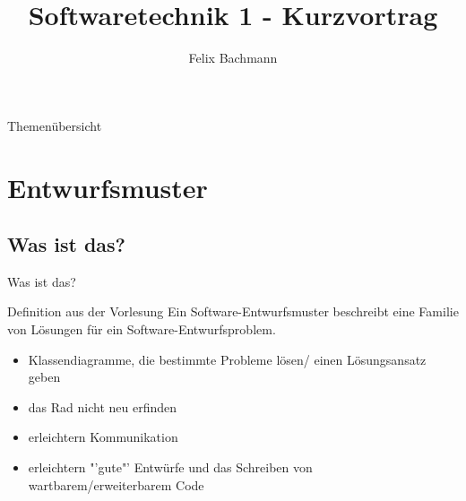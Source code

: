 \documentclass[18pt]{beamer}
\title[SWT1: Kurzvortrag]{Softwaretechnik 1 - Kurzvortrag}
\author{Felix Bachmann}
\institute{KIT - Institut für Programmstrukturen und Datenorganisation (IPD)}
\begin{document}

\begin{frame}
\titlepage
\end{frame}

\begin{frame}{Themenübersicht}
\tableofcontents
\end{frame}

\section{Entwurfsmuster}
	\subsection{Was ist das?}
		\begin{frame}{Was ist das?}	
			\begin{block}{Definition aus der Vorlesung}
				Ein Software-Entwurfsmuster beschreibt eine Familie von Lösungen für ein Software-Entwurfsproblem.
			\end{block}
			\begin{itemize}
				\item Klassendiagramme, die bestimmte Probleme lösen/ einen Lösungsansatz geben
				\item das Rad nicht neu erfinden	
				\item erleichtern Kommunikation
				\item erleichtern "'gute"' Entwürfe und das Schreiben von wartbarem/erweiterbarem Code
			\end{itemize}
		\end{frame}
\end{document}
